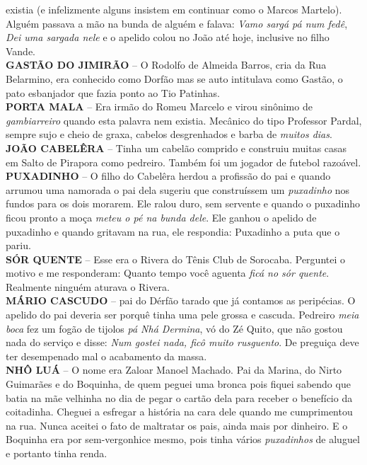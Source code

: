 \documentclass[12pt,brazil,]{book}
\begin{document}
existia (e infelizmente alguns insistem em continuar como o Marcos
Martelo). Alguém passava a mão na bunda de alguém e falava: \emph{Vamo
sargá pá num fedê}, \emph{Dei uma sargada nele} e o apelido colou no
João até hoje, inclusive no filho Vande.\\
\textbf{GASTÃO DO JIMIRÃO} -- O Rodolfo de Almeida Barros, cria da Rua
Belarmino, era conhecido como Dorfão mas se auto intitulava como Gastão,
o pato esbanjador que fazia ponto ao Tio Patinhas.\\
\textbf{PORTA MALA} -- Era irmão do Romeu Marcelo e virou sinônimo de
\emph{gambiarreiro} quando esta palavra nem existia. Mecânico do tipo
Professor Pardal, sempre sujo e cheio de graxa, cabelos desgrenhados e
barba de \emph{muitos dias}.\\
\textbf{JOÃO CABELÊRA} -- Tinha um cabelão comprido e construiu muitas
casas em Salto de Pirapora como pedreiro. Também foi um jogador de
futebol razoável.\\
\textbf{PUXADINHO} -- O filho do Cabelêra herdou a profissão do pai e
quando arrumou uma namorada o pai dela sugeriu que construíssem um
\emph{puxadinho} nos fundos para os dois morarem. Ele ralou duro, sem
servente e quando o puxadinho ficou pronto a moça \emph{meteu o pé na
bunda dele}. Ele ganhou o apelido de puxadinho e quando gritavam na rua,
ele respondia: Puxadinho a puta que o pariu.\\
\textbf{SÓR QUENTE} -- Esse era o Rivera do Tênis Club de Sorocaba.
Perguntei o motivo e me responderam: Quanto tempo você aguenta
\emph{ficá no sór quente}. Realmente ninguém aturava o Rivera.\\
\textbf{MÁRIO CASCUDO} -- pai do Dérfão tarado que já contamos as
peripécias. O apelido do pai deveria ser porquê tinha uma pele grossa e
cascuda. Pedreiro \emph{meia boca} fez um fogão de tijolos \emph{pá Nhá
Dermina}, vó do Zé Quito, que não gostou nada do serviço e disse:
\emph{Num gostei nada, ficô muito rusguento}. De preguiça deve ter
desempenado mal o acabamento da massa.\\
\textbf{NHÔ LUÁ} -- O nome era Zaloar Manoel Machado. Pai da Marina, do
Nirto Guimarães e do Boquinha, de quem peguei uma bronca pois fiquei
sabendo que batia na mãe velhinha no dia de pegar o cartão dela para
receber o benefício da coitadinha. Cheguei a esfregar a história na cara
dele quando me cumprimentou na rua. Nunca aceitei o fato de maltratar os
pais, ainda mais por dinheiro. E o Boquinha era por sem-vergonhice
mesmo, pois tinha vários \emph{puxadinhos} de aluguel e portanto tinha
renda.\\
\end{document}
